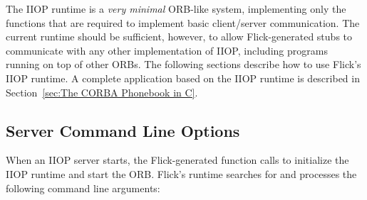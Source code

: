 

The IIOP runtime is a \emph{very minimal} ORB-like system, implementing only
the functions that are required to implement basic client/server communication.
The current runtime should be sufficient, however, to allow Flick-generated
stubs to communicate with any other implementation of IIOP, including programs
running on top of other ORBs.
%
The following sections describe how to use Flick's IIOP runtime.  A complete
application based on the IIOP runtime is described in Section~\ref{sec:The
CORBA Phonebook in C}.



\subsection{Server Command Line Options}
\label{subsec:Server Command Line Options}

When an IIOP server starts, the Flick-generated  function calls
 to initialize the IIOP runtime and start the ORB\@.
Flick's runtime searches for and processes the following command line
arguments:

